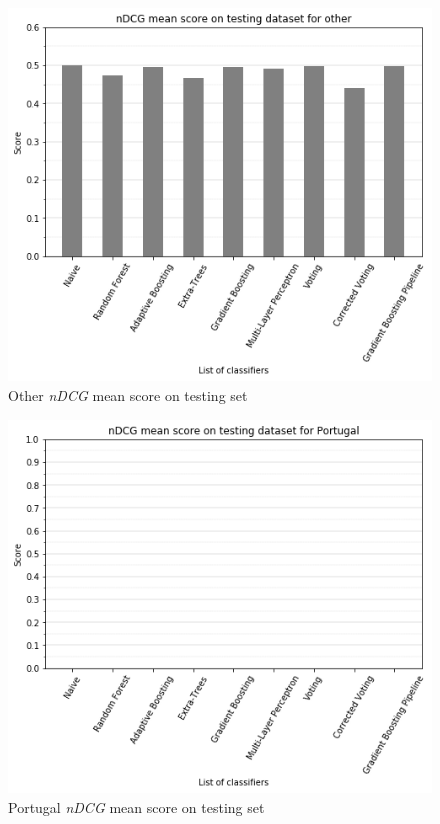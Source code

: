 \documentclass[twocolumn, switch]{article}
\begin{document}
\begin{figure}[H]
\centering
\includegraphics[scale=0.35]{../graphs/ndcg_mean_score_other_test}
\caption{Other \textit{nDCG} mean score on testing set}
\label{fig:ndcgtestother}
\end{figure}

\begin{figure}[H]
\centering
\includegraphics[scale=0.35]{../graphs/ndcg_mean_score_pt_test}
\caption{Portugal \textit{nDCG} mean score on testing set}
\label{fig:ndcgtestpt}
\end{figure}
\end{document}
